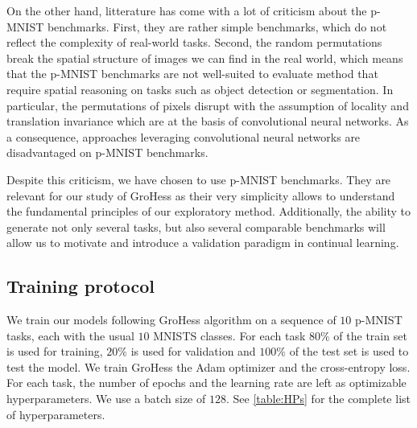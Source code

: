 \documentclass[11pt]{article}
\begin{document}
\vspace{2mm}
\noindent
On the other hand, litterature has come with a lot of criticism about the p-MNIST benchmarks. First, they are rather simple benchmarks, which do not reflect the complexity of real-world tasks. Second, the random permutations break the spatial structure of images we can find in the real world, which means that the p-MNIST benchmarks are not well-suited to evaluate method that require spatial reasoning on tasks such as object detection or segmentation. In particular, the permutations of pixels disrupt with the assumption of locality and translation invariance which are at the basis of convolutional neural networks. As a consequence, approaches leveraging convolutional neural networks are disadvantaged on p-MNIST benchmarks.

\vspace{2mm}
\noindent
Despite this criticism, we have chosen to use p-MNIST benchmarks. They are relevant for our study of GroHess as their very simplicity allows to understand the fundamental principles of our exploratory method. Additionally, the ability to generate not only several tasks, but also several comparable benchmarks will allow us to motivate and introduce a validation paradigm in continual learning.


\subsection{Training protocol}


We train our models following GroHess algorithm on a sequence of $10$ p-MNIST tasks, each with the usual $10$ MNISTS classes. For each task $80\%$ of the train set is used for training, $20\%$ is used for validation and $100\%$ of the test set is used to test the model. We train GroHess the Adam optimizer and the cross-entropy loss. For each task, the number of epochs and the learning rate are left as optimizable hyperparameters. We use a batch size of $128$. See \ref{table:HPs} for the complete list of hyperparameters.
\end{document}
